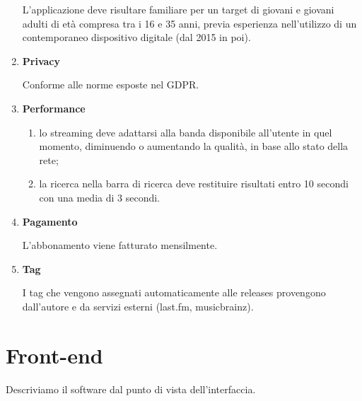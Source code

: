 \documentclass[a4paper,12pt]{article}
\begin{document}
\begin{enumerate}[label=\textbf{RNF\arabic*}\;, ref=\textbf{RNF\arabic*}]
    L’applicazione deve risultare familiare per un target di giovani e giovani adulti di età compresa tra i 16 e 35 anni, previa esperienza nell’utilizzo di un contemporaneo dispositivo digitale (dal 2015 in poi).
    \item \label{privacy} \textbf{Privacy}
    
    Conforme alle norme esposte nel GDPR.
    \item \label{performance} \textbf{Performance}
    
    \begin{enumerate}[label=\textbf{\alph*}, ref=\textbf{RNF6\alph*}, itemsep=0.5em]
        \item \label{qualità streaming} lo streaming deve adattarsi alla banda disponibile all’utente in quel momento, diminuendo o aumentando la qualità, in base allo stato della rete;
        \item \label{velocità ricerca} la ricerca nella barra di ricerca deve restituire risultati entro 10 secondi con una media di 3 secondi.
    \end{enumerate}

    \item \label{pagamento non funzionale} \textbf{Pagamento}
    
    L’abbonamento viene fatturato mensilmente.
    \item \label{tag} \textbf{Tag}
    
    I tag che vengono assegnati automaticamente alle releases provengono dall’autore e da servizi esterni (last.fm, musicbrainz).
\end{enumerate}

\section{Front-end}

Descriviamo il software dal punto di vista dell'interfaccia.
\end{document}
